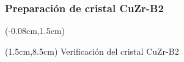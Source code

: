 %   
\begin{frame}
  \frametitle{Preparaci\'on de cristal CuZr-B2}
    \begin{textblock*}{12.6cm}(-0.08cm,1.5cm) 
      \begin{figure}[htp]
	\centering
      \end{figure}
    \end{textblock*}
    \begin{textblock*}{10cm}(1.5cm,8.5cm) 
    \centering
      Verificaci\'on del cristal CuZr-B2
  \end{textblock*}
\end{frame}

